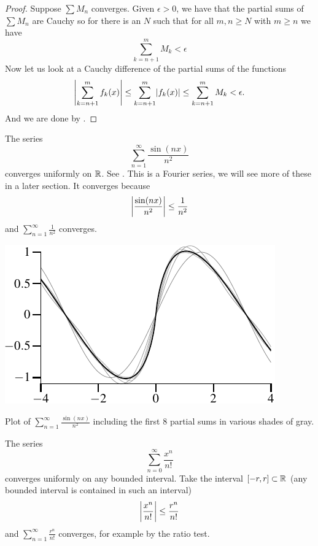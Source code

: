\begin{proof}
Suppose $\sum M_n$ converges.  Given $\epsilon > 0$,
we have that the partial sums of $\sum M_n$ are Cauchy so for
there is an $N$ such that for all $m, n \geq N$ with $m \geq n$ we have
\begin{equation*}
\sum_{k=n+1}^m M_k < \epsilon
\end{equation*}
Now let us look at a Cauchy difference of the partial
sums of the functions
\begin{equation*}
\left\lvert {\sum_{k=n+1}^m f_k(x)} \right\rvert \leq
\sum_{k=n+1}^m \lvert {f_k(x)} \rvert \leq
\sum_{k=n+1}^m M_k < \epsilon .
\end{equation*}
And we are done by .
\end{proof}

\begin{example}
The series
\begin{equation*}
\sum_{n=1}^\infty \frac{\sin(nx)}{n^2}
\end{equation*}
converges uniformly on ${\mathbb{R}}$.  See .
This is a Fourier series,
we will see more of these in a later section.  It converges because
\begin{equation*}
\left\lvert {\frac{\sin(nx)}{n^2}} \right\rvert \leq 
\frac{1}{n^2}
\end{equation*}
and
$\sum_{n=1}^\infty \frac{1}{n^2}$
converges.
\end{example}

\begin{myfigureht}
\includegraphics{figures/fouriersern2}
\caption{Plot of 
$\sum_{n=1}^\infty \frac{\sin(n x)}{n^2}$ including
the first 8 partial sums in various shades of gray.\label{fig:fouriersern2}}
\end{myfigureht}

\begin{example}
The series
\begin{equation*}
\sum_{n=0}^\infty \frac{x^n}{n!} 
\end{equation*}
converges uniformly on any bounded interval.
Take the interval $[-r,r] \subset {\mathbb{R}}$ (any bounded interval
is contained in such an interval)
\begin{equation*}
\left\lvert {\frac{x^n}{n!} } \right\rvert \leq 
\frac{r^n}{n!}
\end{equation*}
and 
$\sum_{n=1}^\infty \frac{r^n}{n!}$ converges, for example by the ratio test.
\end{example}

